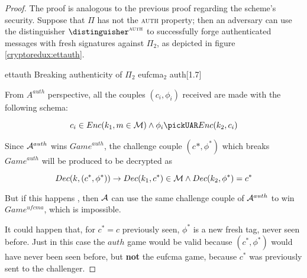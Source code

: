 \begin{proof}
    The proof is analogous to the previous proof regarding the scheme's \cpa{} security. Suppose that $\Pi$ has not the \textsc{auth} property; then an adversary can use the distinguisher $\distinguisher^{\textsc{auth}}$ to successfully forge authenticated messages with fresh signatures against $\Pi_2$, as depicted in figure \ref{cryptoredux:ettauth}.
    
    \begin{cryptoredux}
        {ettauth}
        {Breaking authenticity of $\Pi_2$}
        {eufcma$_2$}
        {auth}[1.7]

        \cseqbeginloop


        \cseqendloop

        \cseqdelay


    \end{cryptoredux}

From $A^{auth}$ perspective, all the couples $(c_{i}, \phi_{i})$ received are made with the following schema:

\begin{equation*}
    c_{i} \in Enc(k_{1}, m \in \M) \wedge \phi_{i}\pickUAR Enc(k_{2}, c_{i})
\end{equation*}

Since $\mathcal{A}^{auth}$ wins $Game^{auth}$, the challenge couple $(c^{}{*}, \phi^{*})$ which breaks $Game^{auth}$ will be produced to be decrypted as

\begin{equation*}
    Dec(k, (c^{*}, \phi^{*})) \rightarrow Dec(k_{1}, c^{*}) \in \mathcal{M} \wedge
    Dec(k_{2}, \phi^{*})=c^{*}
\end{equation*}

But if this happens , then $\mathcal{A}$ can use the same challenge couple of $\mathcal{A}^{auth}$ to win $Game^{ufcma}$, which is impossible.

It could happen that, for $c^{*}=c$ previously seen, $\phi^{*}$ is a new fresh tag, never seen before. Just in this case the $auth$ game would be valid because $(c^{*}, \phi^{*})$ would have never been seen before, but \textbf{not } the eufcma game, because $c^{*}$ was previously sent to the challenger.
\end{proof}
    
